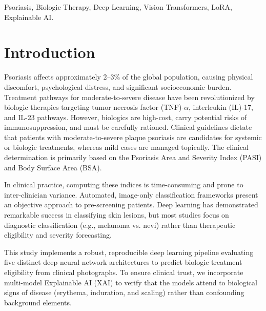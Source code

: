 \documentclass[11pt,journal,compsoc]{IEEEtran}
\begin{document}
\begin{abstract}
\textbf{Conclusions:} Deep learning models, particularly EfficientNet-B3 and LoRA-adapted Vision Transformers, can accurately identify patients matching biologic therapy eligibility thresholds from skin lesion photographs alone. The high classification scores combined with interpretable heatmaps present a robust baseline for clinical decision support systems in dermatology.
\end{abstract}

\begin{IEEEkeywords}
Psoriasis, Biologic Therapy, Deep Learning, Vision Transformers, LoRA, Explainable AI.
\end{IEEEkeywords}

\section{Introduction}
Psoriasis affects approximately 2--3\% of the global population, causing physical discomfort, psychological distress, and significant socioeconomic burden. Treatment pathways for moderate-to-severe disease have been revolutionized by biologic therapies targeting tumor necrosis factor (TNF)-$\alpha$, interleukin (IL)-17, and IL-23 pathways. However, biologics are high-cost, carry potential risks of immunosuppression, and must be carefully rationed. Clinical guidelines dictate that patients with moderate-to-severe plaque psoriasis are candidates for systemic or biologic treatments, whereas mild cases are managed topically. The clinical determination is primarily based on the Psoriasis Area and Severity Index (PASI) and Body Surface Area (BSA).

In clinical practice, computing these indices is time-consuming and prone to inter-clinician variance. Automated, image-only classification frameworks present an objective approach to pre-screening patients. Deep learning has demonstrated remarkable success in classifying skin lesions, but most studies focus on diagnostic classification (e.g., melanoma vs. nevi) rather than therapeutic eligibility and severity forecasting.

This study implements a robust, reproducible deep learning pipeline evaluating five distinct deep neural network architectures to predict biologic treatment eligibility from clinical photographs. To ensure clinical trust, we incorporate multi-model Explainable AI (XAI) to verify that the models attend to biological signs of disease (erythema, induration, and scaling) rather than confounding background elements.
\end{document}

